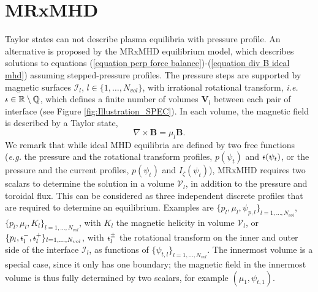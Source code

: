 \documentclass[my_thesis.tex]{subfiles}
\begin{document}
\section{MRxMHD}
\label{section mrxmhd}

Taylor states can not describe plasma equilibria with pressure profile. An alternative is proposed by the MRxMHD equilibrium model, which describes solutions to equations (\ref{equation perp force balance})-(\ref{equation div B ideal mhd}) assuming stepped-pressure profiles. The pressure steps are supported by magnetic surfaces $\mathcal{I}_l$, $l\in\{1,\ldots,N_{vol}\}$, with irrational rotational transform, \textit{i.e.} $\text{$\iota\!\!$-}\in\mathbb{R}\setminus\mathbb{Q}$, which defines a finite number of volumes $\mathbf{V}_l$ between each pair of interface (see Figure \ref{fig:Illustration_SPEC}). In each volume, the magnetic field is described by a Taylor state, 
\begin{equation}
	\nabla\times\mathbf{B}=\mu_l\mathbf{B}. \label{eq.BeltramiEquation}
\end{equation}
We remark that while ideal \ac{MHD} equilibria are defined by two free functions (\textit{e.g.} the pressure and the rotational transform profiles, $p(\psi_t)$ and $\text{$\iota\!\!$-}(\psi_t)$, or the pressure and the current profiles, $p(\psi_t)$ and $I_\zeta(\psi_t)$), \ac{MRxMHD} requires two scalars to determine the solution in a volume $\mathcal{V}_l$, in addition to the pressure and toroidal flux. This can be considered as three independent discrete profiles that are required to determine an equilibrium. Examples are $\{p_l, \mu_l, \psi_{p,l}\}_{l=1,\ldots,N_{vol}}$, $\{p_l, \mu_l, K_l\}_{l=1,\ldots,N_{vol}}$, with $K_l$ the magnetic helicity in volume $\mathcal{V}_l$, or $\{p_l,\text{$\iota\!\!$-}^-_l,\text{$\iota\!\!$-}^+_l\}_{l=1,\ldots,N_{vol}}$, with $\text{$\iota\!\!$-}^\pm_l$ the rotational transform on the inner and outer side of the interface $\mathcal{I}_l$, as functions of $\{\psi_{t,l}\}_{l=1,\ldots,N_{vol}}$. The innermost volume is a special case, since it only has one boundary; the magnetic field in the innermost volume is thus fully determined by two scalars, for example $(\mu_1,\psi_{t,1})$.
\end{document}
